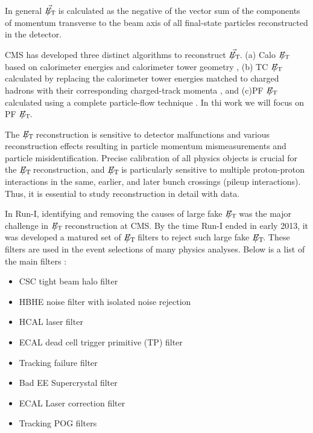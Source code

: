 In general $\vec{E_{\mathrm{T}}\hspace{-1.1em}/\kern0.45em}$ is calculated as the negative of the vector sum of the components of momentum transverse to the beam axis of all final-state particles reconstructed in the detector. 

CMS has developed three distinct algorithms to reconstruct $\vec{E_{\mathrm{T}}\hspace{-1.1em}/\kern0.45em}$. (a) Calo $E_{\mathrm{T}}\hspace{-1.1em}/\kern0.45em$  based on calorimeter energies and calorimeter tower geometry \cite{CaloMET}, (b) TC $E_{\mathrm{T}}\hspace{-1.1em}/\kern0.45em$ calculated by replacing the calorimeter tower energies matched to charged hadrons with their corresponding charged-track momenta \cite{TrackMET}, and (c)PF $E_{\mathrm{T}}\hspace{-1.1em}/\kern0.45em$ calculated using a complete particle-flow technique \cite{PF1}. In thi work we will focus on PF $E_{\mathrm{T}}\hspace{-1.1em}/\kern0.45em$.

The $E_{\mathrm{T}}\hspace{-1.1em}/\kern0.45em$ reconstruction is sensitive to detector malfunctions and various reconstruction effects resulting in particle momentum mismeasurements and particle misidentification. Precise calibration of all physics objects is crucial for the $E_{\mathrm{T}}\hspace{-1.1em}/\kern0.45em$ reconstruction, and $E_{\mathrm{T}}\hspace{-1.1em}/\kern0.45em$ is particularly sensitive to multiple proton-proton interactions in the same, earlier, and later bunch crossings (pileup interactions). Thus, it is essential to study reconstruction in detail with data.


In Run-I, identifying and removing the causes of large fake $E_{\mathrm{T}}\hspace{-1.1em}/\kern0.45em$ was the major challenge in $E_{\mathrm{T}}\hspace{-1.1em}/\kern0.45em$ reconstruction at CMS. By the time Run-I ended in early 2013, it was developed a matured set of $E_{\mathrm{T}}\hspace{-1.1em}/\kern0.45em$ filters to reject such large fake $E_{\mathrm{T}}\hspace{-1.1em}/\kern0.45em$. These filters are used in the event selections of many physics analyses. Below is a list of the main filters \cite{FiltersMET}:
\begin{itemize}
\item 
CSC tight beam halo filter
\item
HBHE noise filter with isolated noise rejection
\item
HCAL laser filter
\item
ECAL dead cell trigger primitive (TP) filter
\item
Tracking failure filter
\item
Bad EE Supercrystal filter
\item
ECAL Laser correction filter
\item
Tracking POG filters
\end{itemize}

